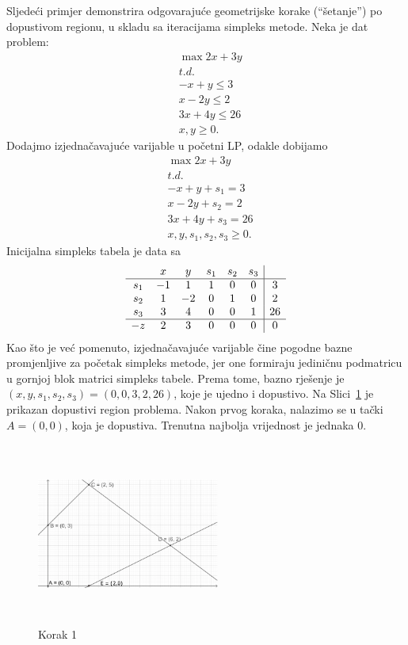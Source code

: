 \documentclass[a4paper, utf8, 11pt, colorlinks]{book}
\theoremstyle{definition}
\begin{document}
Sljedeći primjer demonstrira odgovarajuće geometrijske korake (``šetanje'') po dopustivom regionu, u skladu sa iteracijama simpleks metode.   %
 Neka je dat problem:
 \begin{align*}
 	&\max 2x + 3y \\
 	&  {t.d.} \\
 	& -x + y \leq 3 \\
 	& x - 2y \leq 2 \\
 	& 3x + 4y \leq 26 \\
 	& x, y \geq 0.
 \end{align*}
 Dodajmo izjednačavajuće varijable u početni LP, odakle dobijamo 
  \begin{align*}
 	&\max 2x + 3y \\
 	& t.d. \\
 	& -x + y + s_1 = 3 \\
 	& x - 2y + s_2 = 2 \\
 	& 3x + 4y + s_3 =  26 \\
 	& x, y, s_1, s_2, s_3 \geq 0.
 \end{align*}
 Inicijalna simpleks 
tabela je data sa
$$\begin{array}{cccccc| c}
	& x & y & s_1 & s_2 & s_3 & \\ \hline
	s_1  & -1 & 1 & 1 & 0 & 0 & 3 \\
	s_2  & 1 & -2 & 0 & 1 & 0 & 2 \\
	s_3  & 3 & 4 & 0 & 0 & 1 & 26 \\ \hline
	-z  & 2 & 3 & 0 & 0 & 0 & 0 \\
\end{array}
$$ 
Kao što je već pomenuto, izjednačavajuće varijable čine pogodne bazne promjenljive za početak simpleks metode, jer one formiraju jediničnu podmatricu u gornjoj blok matrici 
simpleks tabele. Prema tome, bazno rješenje je
$(x, y, s_1, s_2, s_3) = (0, 0, 3, 2, 26)$, koje je ujedno i dopustivo.
Na Slici~\ref{fig:step-1} je prikazan dopustivi region problema. Nakon prvog koraka, nalazimo se u tački $A=(0,0)$, koja je dopustiva. Trenutna najbolja vrijednost je jednaka 0. 
\begin{figure}[H]
	\centering
	\includegraphics[width=170pt, height=170pt]{simpleks-primjer-2-sl1.eps}
	\caption{Korak 1}
	\label{fig:step-1}
\end{figure}
\end{document}
